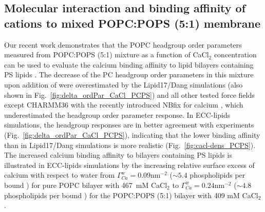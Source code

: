 \documentclass[journal=jpcbfk,manuscript=article]{achemso}
\begin{document}
\subsection{Molecular interaction and binding affinity of  cations to mixed POPC:POPS (5:1) membrane} 
\label{section:lip-ion_ca}

Our recent work demonstrates that the POPC headgroup order parameters measured
from POPC:POPS (5:1) mixture as a function of CaCl$_2$ concentration 
can be used to evaluate the calcium binding affinity to lipid bilayers containing PS lipids \cite{roux90, NMRlipidsIV}.
The decrease of the PC headgroup order parameters in this mixture upon addition of  
were overestimated by the Lipid17/Dang simulations (also shown in Fig.~\ref{fig:delta_ordPar_CaCl_PCPS})
and all other tested force fields except CHARMM36 with the recently introduced NBfix for calcium \cite{kim16},
which underestimated the headgroup order parameter response.
In ECC-lipids simulations, the headgroup responses are in better agreement with experiments (Fig.~\ref{fig:delta_ordPar_CaCl_PCPS}),
indicating that the lower binding affinity than in Lipid17/Dang simulations is more realistic (Fig.~\ref{fig:cacl-dens_PCPS}).
The increased calcium binding affinity to bilayers containing PS lipids is illustrated in
ECC-lipids simulations by the increasing relative surface excess of calcium with respect to water from
   $\Gamma^{w}_{Ca} = 0.09\mathrm{nm^{-2}}$ ($\sim 5.4$ phospholipids per bound ) for pure POPC bilayer with 467~mM CaCl$_2$ \cite{ECC-POPC_nacl_cacl2_files} 
to $\Gamma^{w}_{Ca} = 0.24\mathrm{nm^{-2}}$ ($\sim 4.8$ phospholipids per bound ) for the POPC:POPS (5:1) bilayer with 409 mM CaCl$_2$.
\end{document}
